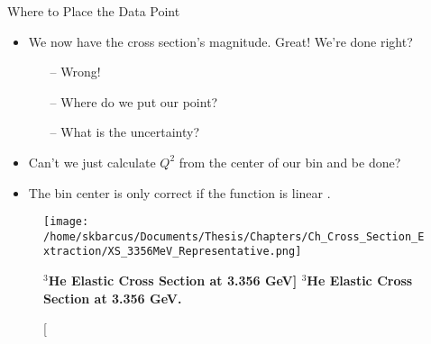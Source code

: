 \documentclass[10pt]{beamer}
\begin{document}
\begin{frame}[fragile]{Where to Place the Data Point}

	\begin{itemize}
		\item We now have the cross section's \alert{magnitude}. Great! We're done right?
			\begin{itemize}
				\pause
				\item[--]  \alert{Wrong}!
				\pause
				\item[--] \alert{Where do we put our point}? 
				\item[--] What is the \alert{uncertainty}?
			\end{itemize}
		\pause
		\item Can't we just calculate $Q^2$ from the \alert{center of our bin} and be done?
		\item The bin center is only correct if the function is \alert{linear} \cite{Article:data_placement}.
	\end{itemize}
	
	\pause
	\vspace{-3mm}
	\begin{figure}[!ht]
	\begin{center}
	\texttt{[image: /home/skbarcus/Documents/Thesis/Chapters/Ch\_Cross\_Section\_Extraction/XS\_3356MeV\_Representative.png]}
	\end{center}
	\caption[\bf{$^3$He Elastic Cross Section at 3.356 GeV}]{
	{\bf{$^3$He Elastic Cross Section at 3.356 GeV.}} }
	\label{fig:xs_bin}
	\end{figure}

\end{frame}
\end{document}
